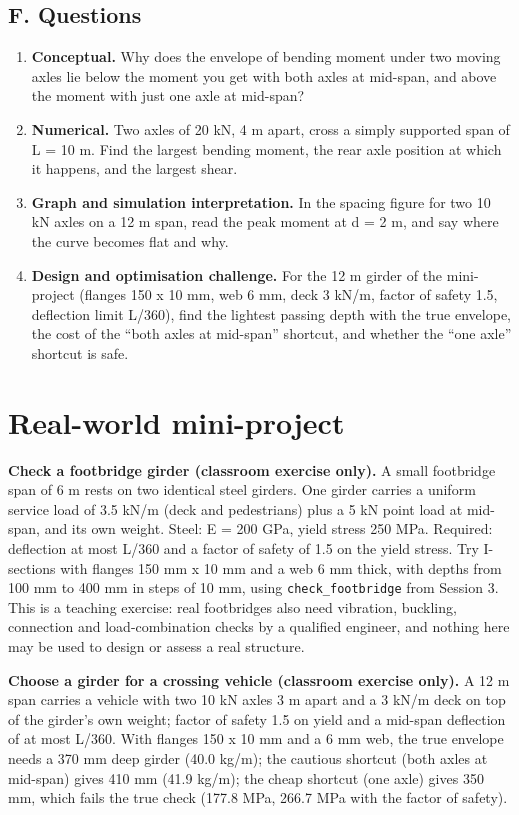 \documentclass[11pt,a4paper]{article}
\begin{document}
\subsection*{F. Questions}
\begin{enumerate}[nosep]
\item \textbf{Conceptual.} Why does the envelope of bending moment under two moving axles lie below the moment you get with both axles at mid-span, and above the moment with just one axle at mid-span?
\item \textbf{Numerical.} Two axles of 20 kN, 4 m apart, cross a simply supported span of L = 10 m. Find the largest bending moment, the rear axle position at which it happens, and the largest shear.
\item \textbf{Graph and simulation interpretation.} In the spacing figure for two 10 kN axles on a 12 m span, read the peak moment at d = 2 m, and say where the curve becomes flat and why.
\item \textbf{Design and optimisation challenge.} For the 12 m girder of the mini-project (flanges 150 x 10 mm, web 6 mm, deck 3 kN/m, factor of safety 1.5, deflection limit L/360), find the lightest passing depth with the true envelope, the cost of the ``both axles at mid-span'' shortcut, and whether the ``one axle'' shortcut is safe.
\end{enumerate}

\section{Real-world mini-project}
\textbf{Check a footbridge girder (classroom exercise only).} A small footbridge span of 6 m rests on two identical steel girders. One girder carries a uniform service load of 3.5 kN/m (deck and pedestrians) plus a 5 kN point load at mid-span, and its own weight. Steel: E = 200 GPa, yield stress 250 MPa. Required: deflection at most L/360 and a factor of safety of 1.5 on the yield stress. Try I-sections with flanges 150 mm x 10 mm and a web 6 mm thick, with depths from 100 mm to 400 mm in steps of 10 mm, using \texttt{check\_footbridge} from Session 3. This is a teaching exercise: real footbridges also need vibration, buckling, connection and load-combination checks by a qualified engineer, and nothing here may be used to design or assess a real structure.

\textbf{Choose a girder for a crossing vehicle (classroom exercise only).} A 12 m span carries a vehicle with two 10 kN axles 3 m apart and a 3 kN/m deck on top of the girder's own weight; factor of safety 1.5 on yield and a mid-span deflection of at most L/360. With flanges 150 x 10 mm and a 6 mm web, the true envelope needs a 370 mm deep girder (40.0 kg/m); the cautious shortcut (both axles at mid-span) gives 410 mm (41.9 kg/m); the cheap shortcut (one axle) gives 350 mm, which fails the true check (177.8 MPa, 266.7 MPa with the factor of safety).
\end{document}
